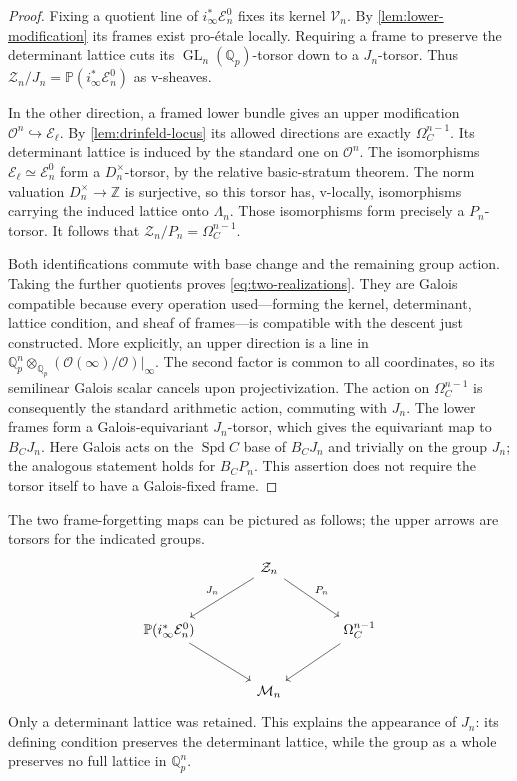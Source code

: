 \documentclass[11pt]{article}
\numberwithin{equation}{section}
\theoremstyle{definition}
\theoremstyle{remark}
\begin{document}
\begin{proof}
Fixing a quotient line of $i_\infty^*\mathcal E_n^0$ fixes its kernel
$\mathcal V_n$.  By \cref{lem:lower-modification} its frames exist
pro-\'etale locally.  Requiring a frame to preserve the determinant
lattice cuts its $\operatorname{GL}_n(\mathbb Q_p)$-torsor down to a $J_n$-torsor.
Thus
$\mathcal Z_n/J_n=\mathbb P(i_\infty^*\mathcal E_n^0)$
as v-sheaves.

In the other direction, a framed lower bundle gives an upper
modification $\mathcal O^n\hookrightarrow\mathcal E_\ell$.
By \cref{lem:drinfeld-locus} its allowed directions are exactly
$\Omega_C^{n-1}$.  Its determinant lattice is induced by the standard
one on $\mathcal O^n$.  The isomorphisms
$\mathcal E_\ell\simeq\mathcal E_n^0$ form a $D_n^\times$-torsor,
by the relative basic-stratum theorem.  The norm valuation
$D_n^\times\to\mathbb Z$ is surjective, so this torsor has, v-locally,
isomorphisms carrying the induced lattice onto $\Lambda_n$.
Those isomorphisms form precisely a $P_n$-torsor.
It follows that $\mathcal Z_n/P_n=\Omega_C^{n-1}$.

Both identifications commute with base change and the remaining group
action.  Taking the further quotients proves
\cref{eq:two-realizations}.  They are Galois compatible because every
operation used---forming the kernel, determinant, lattice condition,
and sheaf of frames---is compatible with the descent just constructed.
More explicitly, an upper direction is a line in
$\mathbb Q_p^n\otimes_{\mathbb Q_p}(\mathcal O(\infty)/\mathcal O)|_\infty$.
The second factor is common to all coordinates, so its semilinear
Galois scalar cancels upon projectivization.  The action on
$\Omega_C^{n-1}$ is consequently the standard arithmetic action,
commuting with $J_n$.  The lower frames form a Galois-equivariant
$J_n$-torsor, which gives the equivariant map to $B_CJ_n$.
Here Galois acts on the $\operatorname{Spd} C$ base of $B_CJ_n$ and trivially on
the group $J_n$; the analogous statement holds for $B_CP_n$.
This assertion does not require
the torsor itself to have a Galois-fixed frame.
\end{proof}

The two frame-forgetting maps can be pictured as follows; the upper
arrows are torsors for the indicated groups.
\[
\begin{tikzcd}[column sep=large,row sep=large]
 & \mathcal Z_n \arrow[dl,"J_n"'] \arrow[dr,"P_n"] & \\
 \mathbb P(i_\infty^*\mathcal E_n^0)
       \arrow[dr] && \Omega_C^{n-1}\arrow[dl]\\
 & \mathcal M_n &
\end{tikzcd}
\]
Only a determinant lattice was retained.  This explains the appearance
of $J_n$: its defining condition preserves the determinant lattice,
while the group as a whole preserves no full lattice in $\mathbb Q_p^n$.
\end{document}
